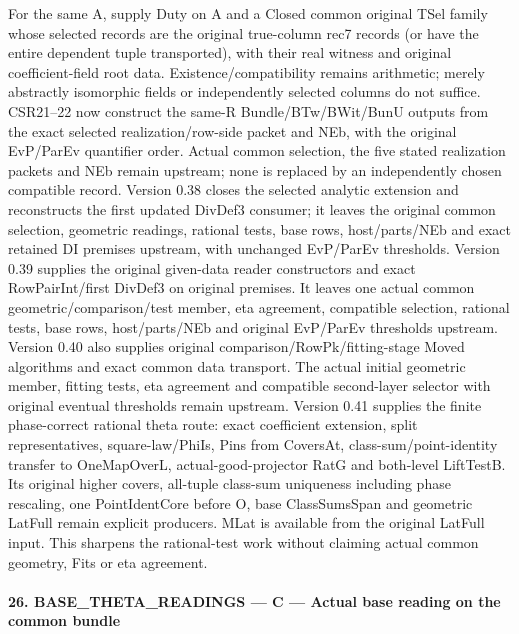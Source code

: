 \documentclass[11pt,a4paper]{article}
\numberwithin{equation}{section}
\theoremstyle{remark}\newtheorem{remark}[theorem]{Remark}
\begin{document}
For the same A, supply Duty on A and a Closed common original TSel family whose selected records are the original true-column rec7 records (or have the entire dependent tuple transported), with their real witness and original coefficient-field root data. Existence/compatibility remains arithmetic; merely abstractly isomorphic fields or independently selected columns do not suffice. CSR21–22 now construct the same-R Bundle/BTw/BWit/BunU outputs from the exact selected realization/row-side packet and NEb, with the original EvP/ParEv quantifier order. Actual common selection, the five stated realization packets and NEb remain upstream; none is replaced by an independently chosen compatible record. Version 0.38 closes the selected analytic extension and reconstructs the first updated DivDef3 consumer; it leaves the original common selection, geometric readings, rational tests, base rows, host/parts/NEb and exact retained DI premises upstream, with unchanged EvP/ParEv thresholds. Version 0.39 supplies the original given-data reader constructors and exact RowPairInt/first DivDef3 on original premises. It leaves one actual common geometric/comparison/test member, eta agreement, compatible selection, rational tests, base rows, host/parts/NEb and original EvP/ParEv thresholds upstream. Version 0.40 also supplies original comparison/RowPk/fitting-stage Moved algorithms and exact common data transport. The actual initial geometric member, fitting tests, eta agreement and compatible second-layer selector with original eventual thresholds remain upstream. Version 0.41 supplies the finite phase-correct rational theta route: exact coefficient extension, split representatives, square-law/PhiIs, Pins from CoversAt, class-sum/point-identity transfer to OneMapOverL, actual-good-projector RatG and both-level LiftTestB. Its original higher covers, all-tuple class-sum uniqueness including phase rescaling, one PointIdentCore before O, base ClassSumsSpan and geometric LatFull remain explicit producers. MLat is available from the original LatFull input. This sharpens the rational-test work without claiming actual common geometry, Fits or eta agreement.



\paragraph{26. BASE\_\allowbreak THETA\_\allowbreak READINGS — C — Actual base reading on the common bundle}
\end{document}
